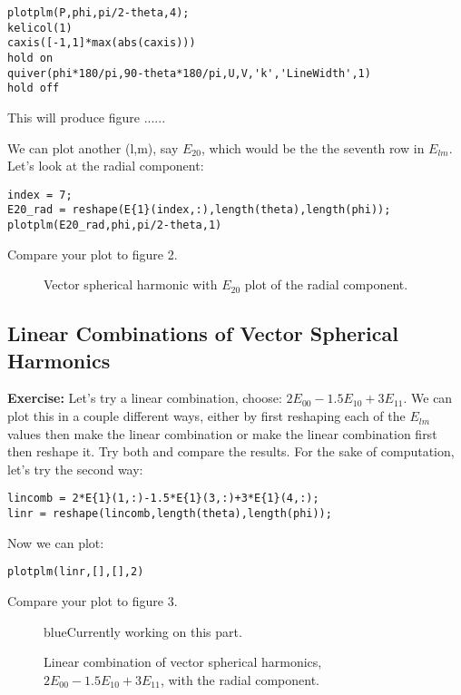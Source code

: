 \documentclass[11pt]{article}
\newcommand{\HERE}{\begin{color}{blue}Currently working on this part.\end{color}}
\begin{document}
\verb|plotplm(P,phi,pi/2-theta,4);|\\
\verb|kelicol(1)|\\
\verb|caxis([-1,1]*max(abs(caxis)))|\\
\verb|hold on|\\
\verb|quiver(phi*180/pi,90-theta*180/pi,U,V,'k','LineWidth',1)|\\
\verb|hold off|

This will produce figure ......

We can plot another (l,m), say $E_{20}$, which would be the the seventh row in $E_{lm}$.  Let's look at the radial component:

\verb|index = 7;|\\
\verb|E20_rad = reshape(E{1}(index,:),length(theta),length(phi));|\\
\verb|plotplm(E20_rad,phi,pi/2-theta,1)|

Compare your plot to figure 2.

\begin{figure}[H]
  \centering
  \caption{Vector spherical harmonic with $E_{20}$ plot of the radial component.}
\label{E7}
\end{figure}

\subsection{Linear Combinations of Vector Spherical Harmonics}

\textbf{Exercise:}  Let's try a linear combination, choose: $2E_{00}-1.5E_{10}+3E_{11}$.  We can plot this in a couple different ways, either by first reshaping each of the $E_{lm}$ values then make the linear combination or make the linear combination first then reshape it.  Try both and compare the results.  For the sake of computation, let's try the second way:

\verb|lincomb = 2*E{1}(1,:)-1.5*E{1}(3,:)+3*E{1}(4,:);|\\
\verb|linr = reshape(lincomb,length(theta),length(phi));|

Now we can plot:

\verb|plotplm(linr,[],[],2)|

Compare your plot to figure 3.

\begin{figure}[H]
  \centering
  \HERE
  \caption{Linear combination of vector spherical harmonics, $2E_{00}-1.5E_{10}+3E_{11}$, with the radial component.}
\label{E}
\end{figure}
\end{document}
